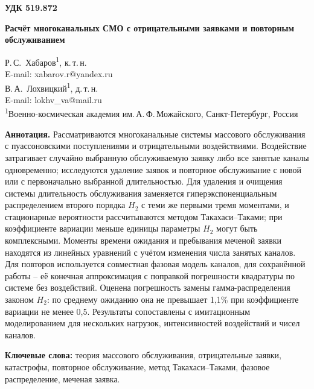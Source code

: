 

\noindent\textbf{УДК 519.872}
\vspace{1em}

\begin{center}
{\Large\bfseries Расчёт многоканальных СМО с отрицательными заявками и повторным обслуживанием}
\end{center}
\vspace{0.8em}

\begin{center}
Р.\,С.~Хабаров\textsuperscript{1}, к.\,т.\,н.\\[2pt]
E-mail: xabarov.r@yandex.ru\\[6pt]
В.\,А.~Лохвицкий\textsuperscript{1}, д.\,т.\,н.\\[2pt]
E-mail: lokhv\_va@mail.ru\\[8pt]
{\small\textsuperscript{1}Военно-космическая академия им.\,А.\,Ф.\,Можайского, Санкт-Петербург, Россия}
\end{center}
\vspace{0.5em}

\noindent\textbf{Аннотация.} 
Рассматриваются многоканальные системы массового обслуживания с пуассоновскими поступлениями и отрицательными воздействиями. Воздействие затрагивает случайно выбранную обслуживаемую заявку либо все занятые каналы одновременно; исследуются удаление заявок и повторное обслуживание с новой или с первоначально выбранной длительностью. Для удаления и очищения системы длительность обслуживания заменяется гиперэкспоненциальным распределением второго порядка \(H_2\) с теми же первыми тремя моментами, и стационарные вероятности рассчитываются методом Такахаси--Таками; при коэффициенте вариации меньше единицы параметры \(H_2\) могут быть комплексными. Моменты времени ожидания и пребывания меченой заявки находятся из линейных уравнений с учётом изменения числа занятых каналов. Для повторов используется совместная фазовая модель каналов, для сохранённой работы -- её конечная аппроксимация с поправкой погрешности квадратуры по системе без воздействий. Оценена погрешность замены гамма-распределения законом \(H_2\): по среднему ожиданию она не превышает 1,1\% при коэффициенте вариации не менее 0,5. Результаты сопоставлены с имитационным моделированием для нескольких нагрузок, интенсивностей воздействий и чисел каналов.

\textbf{Ключевые слова:} теория массового обслуживания, отрицательные заявки, катастрофы, повторное обслуживание, метод Такахаси--Таками, фазовое распределение, меченая заявка.

